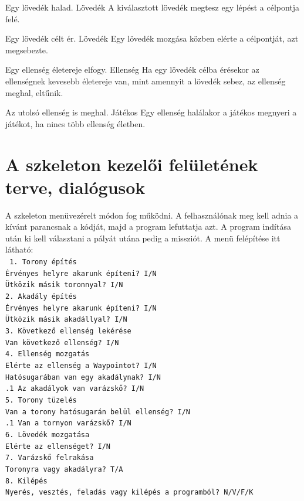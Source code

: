 {Egy lövedék halad.}
{Lövedék}
{A kiválasztott lövedék megtesz egy lépést a célpontja felé.}

{Egy lövedék célt ér.}
{Lövedék}
{Egy lövedék mozgása közben elérte a célpontját, azt megsebezte.}

{Egy ellenség életereje elfogy.}
{Ellenség}
{Ha egy lövedék célba érésekor az ellenségnek kevesebb életereje van, mint amennyit a lövedék sebez, az ellenség meghal, eltűnik.}

{Az utolsó ellenség is meghal.}
{Játékos}
{Egy ellenség halálakor a játékos megnyeri a játékot, ha nincs több ellenség életben.}

\pagebreak
\setlength\parindent{15mm}
\section{A szkeleton kezelői felületének terve, dialógusok}
A szkeleton menüvezérelt módon fog működni. A felhasználónak meg kell adnia a kívánt parancsnak a kódját, majd a program lefuttatja azt. A program indítása után ki kell választani a pályát utána pedig a missziót. A menü felépítése itt látható: \\
\begingroup 
\fontsize{10pt}{10pt}\selectfont
\texttt{
1. Torony építés \\
 Érvényes helyre akarunk építeni? I/N \\
 Ütközik másik toronnyal? I/N \\
2. Akadály építés \\
 Érvényes helyre akarunk építeni? I/N \\
 Ütközik másik akadállyal? I/N \\
3. Következő ellenség lekérése \\
 Van következő ellenség? I/N \\
4. Ellenség mozgatás \\
 Elérte az ellenség a Waypointot? I/N \\
 Hatósugarában van egy akadálynak? I/N \\
\indent {}.1 Az akadályok van varázskő? I/N \\
5. Torony tüzelés \\
 Van a torony hatósugarán belül ellenség? I/N \\
\indent {}.1 Van a tornyon varázskő? I/N \\
6. Lövedék mozgatása \\
 Elérte az ellenséget? I/N \\
7. Varázskő felrakása \\
 Toronyra vagy akadályra? T/A \\
8. Kilépés \\
 Nyerés, vesztés, feladás vagy kilépés a programból? N/V/F/K \\
}
